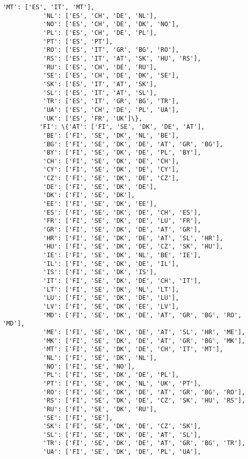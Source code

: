 \documentclass[11pt]{article}
\begin{document}
\begin{Verbatim}[commandchars=\\\{\}]
           'MT': ['ES', 'IT', 'MT'],
           'NL': ['ES', 'CH', 'DE', 'NL'],
           'NO': ['ES', 'CH', 'DE', 'DK', 'NO'],
           'PL': ['ES', 'CH', 'DE', 'PL'],
           'PT': ['ES', 'PT'],
           'RO': ['ES', 'IT', 'GR', 'BG', 'RO'],
           'RS': ['ES', 'IT', 'AT', 'SK', 'HU', 'RS'],
           'RU': ['ES', 'CH', 'DE', 'RU'],
           'SE': ['ES', 'CH', 'DE', 'DK', 'SE'],
           'SK': ['ES', 'IT', 'AT', 'SK'],
           'SL': ['ES', 'IT', 'AT', 'SL'],
           'TR': ['ES', 'IT', 'GR', 'BG', 'TR'],
           'UA': ['ES', 'CH', 'DE', 'PL', 'UA'],
           'UK': ['ES', 'FR', 'UK']\},
          'FI': \{'AT': ['FI', 'SE', 'DK', 'DE', 'AT'],
           'BE': ['FI', 'SE', 'DK', 'NL', 'BE'],
           'BG': ['FI', 'SE', 'DK', 'DE', 'AT', 'GR', 'BG'],
           'BY': ['FI', 'SE', 'DK', 'DE', 'PL', 'BY'],
           'CH': ['FI', 'SE', 'DK', 'DE', 'CH'],
           'CY': ['FI', 'SE', 'DK', 'DE', 'CY'],
           'CZ': ['FI', 'SE', 'DK', 'DE', 'CZ'],
           'DE': ['FI', 'SE', 'DK', 'DE'],
           'DK': ['FI', 'SE', 'DK'],
           'EE': ['FI', 'SE', 'DK', 'EE'],
           'ES': ['FI', 'SE', 'DK', 'DE', 'CH', 'ES'],
           'FR': ['FI', 'SE', 'DK', 'DE', 'LU', 'FR'],
           'GR': ['FI', 'SE', 'DK', 'DE', 'AT', 'GR'],
           'HR': ['FI', 'SE', 'DK', 'DE', 'AT', 'SL', 'HR'],
           'HU': ['FI', 'SE', 'DK', 'DE', 'CZ', 'SK', 'HU'],
           'IE': ['FI', 'SE', 'DK', 'NL', 'BE', 'IE'],
           'IL': ['FI', 'SE', 'DK', 'DE', 'IL'],
           'IS': ['FI', 'SE', 'DK', 'IS'],
           'IT': ['FI', 'SE', 'DK', 'DE', 'CH', 'IT'],
           'LT': ['FI', 'SE', 'DK', 'NL', 'LT'],
           'LU': ['FI', 'SE', 'DK', 'DE', 'LU'],
           'LV': ['FI', 'SE', 'DK', 'EE', 'LV'],
           'MD': ['FI', 'SE', 'DK', 'DE', 'AT', 'GR', 'BG', 'RO', 'MD'],
           'ME': ['FI', 'SE', 'DK', 'DE', 'AT', 'SL', 'HR', 'ME'],
           'MK': ['FI', 'SE', 'DK', 'DE', 'AT', 'GR', 'BG', 'MK'],
           'MT': ['FI', 'SE', 'DK', 'DE', 'CH', 'IT', 'MT'],
           'NL': ['FI', 'SE', 'DK', 'NL'],
           'NO': ['FI', 'SE', 'NO'],
           'PL': ['FI', 'SE', 'DK', 'DE', 'PL'],
           'PT': ['FI', 'SE', 'DK', 'NL', 'UK', 'PT'],
           'RO': ['FI', 'SE', 'DK', 'DE', 'AT', 'GR', 'BG', 'RO'],
           'RS': ['FI', 'SE', 'DK', 'DE', 'CZ', 'SK', 'HU', 'RS'],
           'RU': ['FI', 'SE', 'DK', 'RU'],
           'SE': ['FI', 'SE'],
           'SK': ['FI', 'SE', 'DK', 'DE', 'CZ', 'SK'],
           'SL': ['FI', 'SE', 'DK', 'DE', 'AT', 'SL'],
           'TR': ['FI', 'SE', 'DK', 'DE', 'AT', 'GR', 'BG', 'TR'],
           'UA': ['FI', 'SE', 'DK', 'DE', 'PL', 'UA'],

\end{Verbatim}
\end{document}

